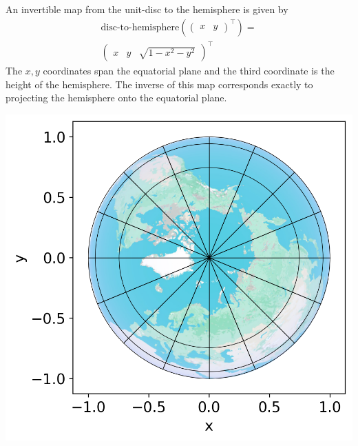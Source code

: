{    An invertible map from the unit-disc to the hemisphere is given by 
    \begin{align*}
        \text{disc-to-hemisphere}(\begin{pmatrix}x & y\end{pmatrix}^\top) = \\\begin{pmatrix}x & y & \sqrt{1 - x^2 - y^2}\end{pmatrix}^\top 
    \end{align*}
    The $x, y$ coordinates span the equatorial plane and the third coordinate is the height of the hemisphere. The inverse of this map corresponds exactly to projecting the hemisphere onto the equatorial plane.
    \begin{center}
        \hspace*{-0.1\columnwidth}\includegraphics[width=0.7\columnwidth]{../images/hemisphere_circle_of_latitude.png}
    \end{center}
}
    
    
    

